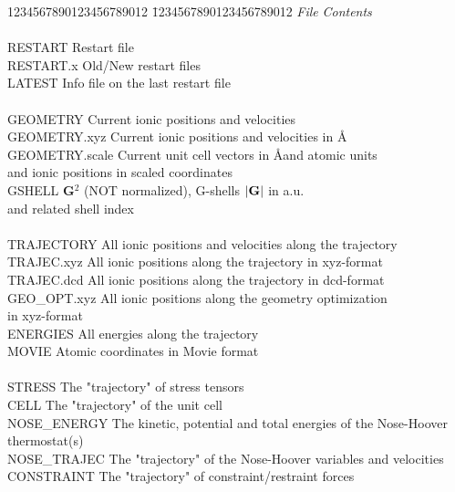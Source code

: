\documentclass[twoside,10pt,titlepage,a4paper]{article}
\begin{document}
\begin{tabbing}
1234567890123456789012 \= 1234567890123456789012  \kill
\textsl{File}   \> \textsl{Contents}                     \\
\\
RESTART         \> Restart file                          \\
RESTART.x       \> Old/New restart files                 \\
LATEST          \> Info file on the last restart file    \\
\\
GEOMETRY        \> Current ionic positions and velocities \\
GEOMETRY.xyz    \> Current ionic positions and velocities in \AA\\
GEOMETRY.scale  \> Current unit cell vectors in \AA and atomic units \\
                 \> and ionic positions in scaled coordinates \\
GSHELL          \> {\bf G}$^2$ (NOT normalized), G-shells $|{\bf G}|$ in a.u.\\
                \> and related shell index \\
\\
TRAJECTORY      \> All ionic positions and velocities along the trajectory \\
TRAJEC.xyz      \> All ionic positions along the trajectory in xyz-format\\
TRAJEC.dcd      \> All ionic positions along the trajectory in dcd-format\\
GEO\_OPT.xyz     \> All ionic positions along the geometry optimization\\
                \> in xyz-format\\
ENERGIES        \> All energies along the trajectory     \\
MOVIE           \> Atomic coordinates in Movie format    \\
\\
STRESS          \> The "trajectory" of stress tensors    \\
CELL            \> The "trajectory" of the unit cell     \\
NOSE\_ENERGY    \> The kinetic, potential and total energies of the Nose-Hoover thermostat(s) \\
NOSE\_TRAJEC    \> The "trajectory" of the Nose-Hoover variables and velocities \\
CONSTRAINT      \> The "trajectory" of constraint/restraint forces \\

\end{tabbing}
\end{document}
